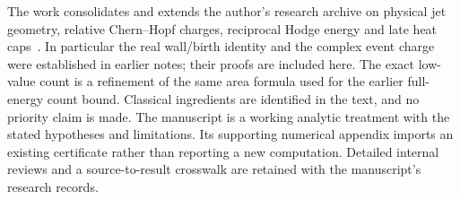 \documentclass[11pt,letterpaper]{article}
\numberwithin{equation}{section}
\theoremstyle{definition}
\theoremstyle{remark}
\begin{document}
The work consolidates and extends the author's research archive on
physical jet geometry, relative Chern--Hopf charges, reciprocal Hodge
energy and late heat caps~\cite{ResearchArchive}. In particular the real
wall/birth identity and the complex event charge were established in
earlier notes; their proofs are included here. The exact low-value count
is a refinement of the same area formula used for the earlier full-energy
count bound. Classical ingredients are identified in the text, and no
priority claim is made. The manuscript is a working analytic treatment
with the stated hypotheses and limitations. Its supporting numerical
appendix imports an existing certificate rather than reporting a new
computation. Detailed internal reviews and a source-to-result crosswalk
are retained with the manuscript's research records.
\end{document}
